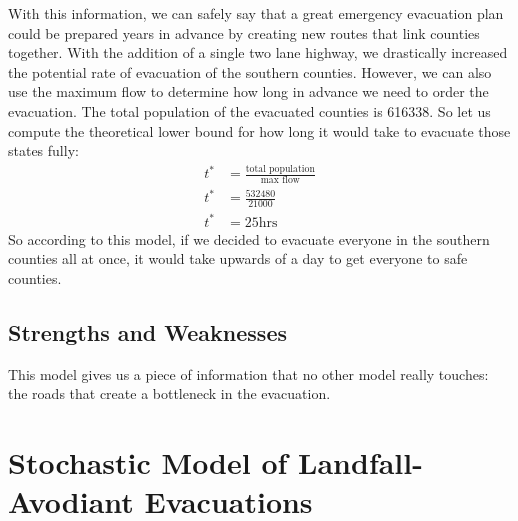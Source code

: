 \documentclass[titlepage]{article}
\begin{document}
    With this information, we can safely say that a great emergency evacuation plan could be prepared years in advance by creating new routes that link counties together. With the addition of a single two lane highway, we drastically increased the potential rate of evacuation of the southern counties. However, we can also use the maximum flow to determine how long in advance we need to order the evacuation.
    The total population of the evacuated counties is 616338. So let us compute the theoretical lower bound for how long it would take to evacuate those states fully:
    \begin{align*}
        t^* &= \frac{\text{total population}}{\text{max flow}}\\
        t^* &= \frac{532480}{21000}\\
        t^* &= 25 \text{hrs}
    \end{align*}
    So according to this model, if we decided to evacuate everyone in the southern counties all at once, it would take upwards of a day to get everyone to safe counties.
  \subsection{Strengths and Weaknesses}
    This model gives us a piece of information that no other model really touches: the roads that create a bottleneck in the evacuation.

\section{Stochastic Model of Landfall-Avodiant Evacuations}
\label{sec:stochastic}
\end{document}
